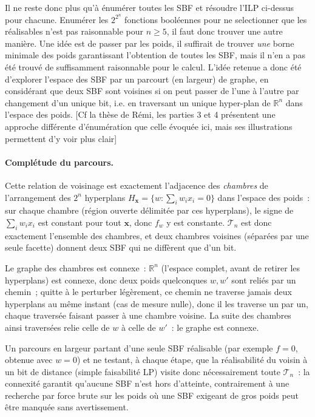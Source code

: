 Il ne reste donc plus qu'à énumérer toutes les SBF et résoudre l'ILP ci-dessus pour chacune. Enumérer les $2^{2^n}$ fonctions booléennes pour ne selectionner que les réalisables n'est pas raisonnable pour $n\ge 5$, il faut donc trouver une autre manière. Une idée est de passer par les poids, il suffirait de trouver \emph{une} borne minimale des poids garantissant l'obtention de toutes les SBF, mais il n'en a pas été trouvé de suffisamment raisonnable pour le calcul. L'idée retenue a donc été d'explorer l'espace des SBF par un parcourt (en largeur) de graphe, en considérant que deux SBF sont voisines si on peut passer de l'une à l'autre par changement d'un unique bit, i.e. en traversant un unique hyper-plan de $\mathbb{R}^n$ dans l'espace des poids. [Cf la thèse de Rémi, les parties 3 et 4 présentent une approche différente d'énumération que celle évoquée ici, mais ses illustrations permettent d'y voir plus clair]

\paragraph{Complétude du parcours.} Cette relation de voisinage est exactement l'adjacence des \emph{chambres} de l'arrangement des $2^n$ hyperplans $H_{\mathbf x} = \{w : \sum_i w_i x_i = 0\}$ dans l'espace des poids~: sur chaque chambre (région ouverte délimitée par ces hyperplans), le signe de $\sum_i w_i x_i$ est constant pour tout $\mathbf x$, donc $f_w$ y est constante. $\mathcal{T}_n$ est donc exactement l'ensemble des chambres, et deux chambres voisines (séparées par une seule facette) donnent deux SBF qui ne diffèrent que d'un bit.

Le graphe des chambres est connexe~: $\mathbb{R}^n$ (l'espace complet, avant de retirer les hyperplans) est connexe, donc deux poids quelconques $w,w'$ sont reliés par un chemin~; quitte à le perturber légèrement, ce chemin ne traverse jamais deux hyperplans au même instant (cas de mesure nulle), donc il les traverse un par un, chaque traversée faisant passer à une chambre voisine. La suite des chambres ainsi traversées relie celle de $w$ à celle de $w'$~: le graphe est connexe.

Un parcours en largeur partant d'une seule SBF réalisable (par exemple $f=0$, obtenue avec $w=0$) et ne testant, à chaque étape, que la réalisabilité du voisin à un bit de distance (simple faisabilité LP) visite donc nécessairement toute $\mathcal{T}_n$~: la connexité garantit qu'aucune SBF n'est hors d'atteinte, contrairement à une recherche par force brute sur les poids où une SBF exigeant de gros poids peut être manquée sans avertissement.

